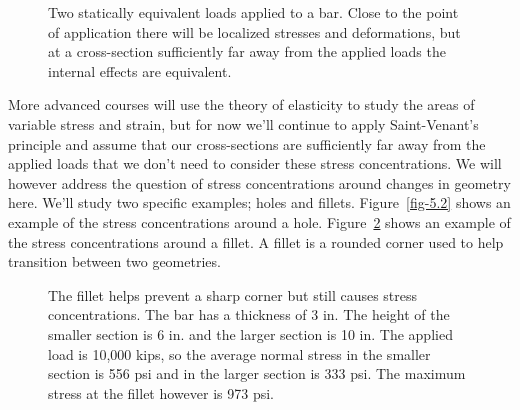 \documentclass[
  letterpaper,
  DIV=11,
  numbers=noendperiod]{scrreprt}
\theoremstyle{definition}
\theoremstyle{remark}
\begin{document}
\begin{figure}


\caption{\label{fig-5.3}Two statically equivalent loads applied to a
bar. Close to the point of application there will be localized stresses
and deformations, but at a cross-section sufficiently far away from the
applied loads the internal effects are equivalent.}

\end{figure}%

More advanced courses will use the theory of elasticity to study the
areas of variable stress and strain, but for now we'll continue to apply
Saint-Venant's principle and assume that our cross-sections are
sufficiently far away from the applied loads that we don't need to
consider these stress concentrations. We will however address the
question of stress concentrations around changes in geometry here. We'll
study two specific examples; holes and fillets. Figure~\ref{fig-5.2}
shows an example of the stress concentrations around a hole.
Figure~\ref{fig-5.4} shows an example of the stress concentrations
around a fillet. A fillet is a rounded corner used to help transition
between two geometries.

\begin{figure}


\caption{\label{fig-5.4}The fillet helps prevent a sharp corner but
still causes stress concentrations. The bar has a thickness of 3 in. The
height of the smaller section is 6 in. and the larger section is 10 in.
The applied load is 10,000 kips, so the average normal stress in the
smaller section is 556 psi and in the larger section is 333 psi. The
maximum stress at the fillet however is 973 psi.}

\end{figure}%
\end{document}

